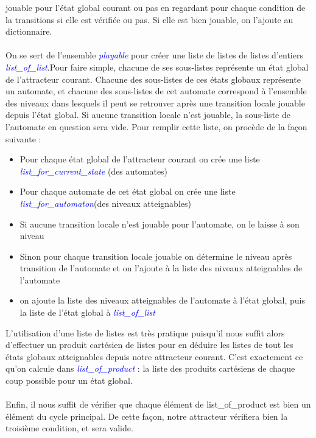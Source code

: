 \documentclass[12pt,a4paper]{article}
\begin{document}
jouable pour l'état global courant ou pas en regardant pour chaque condition de la transitions si elle est vérifiée ou pas. Si elle est bien jouable, on l'ajoute au dictionnaire.\\ \\
On se sert de l'ensemble \emph{\textcolor{blue}{playable}} pour créer une liste de listes de listes d'entiers \emph{\textcolor{blue}{list\_of\_list}}.Pour faire simple, chacune de ses sous-listes représente un état global de 
l'attracteur courant. Chacune des sous-listes de ces états globaux représente un automate, et chacune des sous-listes de cet automate correspond à l'ensemble des niveaux dans lesquels il peut se retrouver après une transition locale 
jouable depuis l'état global. Si aucune transition locale n'est jouable, la sous-liste de l'automate en question sera vide. Pour remplir cette liste, on procède de la façon suivante :\\
\begin{itemize}
	\item Pour chaque état global de l'attracteur courant on crée une liste \emph{\textcolor{blue}{list\_for\_current\_state}} (des automates)
	\item Pour chaque automate de cet état global on crée une liste \emph{\textcolor{blue}{list\_for\_automaton}}(des niveaux atteignables)
	\item Si aucune transition locale n'est jouable pour l'automate, on le laisse à son niveau
	\item Sinon pour chaque transition locale jouable on détermine le niveau après transition de l'automate et on l'ajoute à la liste des niveaux atteignables de l'automate
	\item on ajoute la liste des niveaux atteignables de l'automate à l'état global, puis la liste de l'état global à \emph{\textcolor{blue}{list\_of\_list}}\\
\end{itemize}
L'utilisation d'une liste de listes est très pratique puisqu'il nous suffit alors d'effectuer un produit cartésien de listes pour en déduire les listes de tout les états globaux atteignables depuis notre attracteur courant. C'est 
exactement ce qu'on calcule dans \emph{\textcolor{blue}{list\_of\_product}} : la liste des produits cartésiens de chaque coup possible pour un état global.\\ \\
Enfin, il nous suffit de vérifier que chaque élément de list\_of\_product est bien un élément du cycle principal. De cette façon, notre attracteur vérifiera bien la troisième condition, et sera valide.
\end{document}

